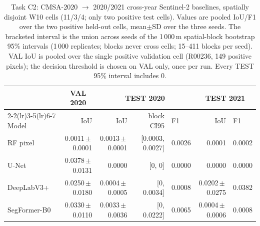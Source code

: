 \begin{table}[t]
\centering
\small
\caption{Task C2: CMSA-2020 $\rightarrow$ 2020/2021 cross-year
Sentinel-2 baselines, spatially disjoint W10 cells (11/3/4; only two
positive test cells). Values are pooled IoU/F1 over the two positive
held-out cells, mean$\pm$SD over the three seeds. The bracketed interval
is the union across seeds of the 1\,000\,m spatial-block bootstrap 95\%
intervals (1\,000 replicates; blocks never cross cells; 15--411 blocks
per seed). VAL IoU is pooled over the single positive validation cell
(R00236, 149 positive pixels); the decision threshold is chosen on VAL
only, once per run. Every TEST 95\% interval includes 0.}
\label{tab:silverc2}
\begin{tabular}{lrrrlrl}
\toprule
& \multicolumn{1}{c}{VAL 2020} & \multicolumn{3}{c}{TEST 2020} & \multicolumn{2}{c}{TEST 2021} \\
\cmidrule(lr){2-2}\cmidrule(lr){3-5}\cmidrule(lr){6-7}
Model & IoU & IoU & block CI95 & F1 & IoU & F1 \\
\midrule
RF pixel      & 0.0011\,$\pm$\,0.0001 & 0.0013\,$\pm$\,0.0001 & [0.0003, 0.0027] & 0.0026 & 0.0001 & 0.0002 \\
U-Net         & 0.0378\,$\pm$\,0.0131 & 0.0000 & [0, 0] & 0.0000 & 0.0000 & 0.0000 \\
DeepLabV3+    & 0.0250\,$\pm$\,0.0180 & 0.0004\,$\pm$\,0.0005 & [0, 0.0034] & 0.0008 & 0.0202\,$\pm$\,0.0275 & 0.0382 \\
SegFormer-B0  & 0.0330\,$\pm$\,0.0110 & 0.0033\,$\pm$\,0.0036 & [0, 0.0222] & 0.0065 & 0.0004\,$\pm$\,0.0006 & 0.0008 \\
\bottomrule
\end{tabular}
\end{table}
